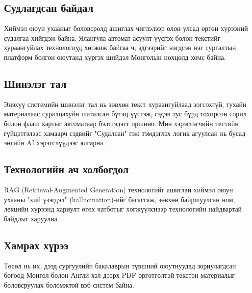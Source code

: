     \subsection*{Судлагдсан байдал}
        Хиймэл оюун ухааныг боловсролд ашиглах чиглэлээр олон улсад өргөн хүрээний судалгаа хийгдэж байна. Ялангуяа автомат асуулт үүсгэх болон текстийг хураангуйлах технологиуд хөгжиж байгаа ч, эдгээрийг нэгдсэн нэг сургалтын платформ болгон оюутанд хүргэх шийдэл Монголын нөхцөлд хомс байна.
        
    \subsection*{Шинэлэг тал}
        Энэхүү системийн шинэлэг тал нь зөвхөн текст хураангуйлаад зогсохгүй, тухайн материалаас суралцахуйн шаталсан бүтэц үүсгэж, сэдэв тус бүрд тохирсон сорил болон флаш картыг автоматаар бэлтгэдэгт оршино. Мөн хэрэглэгчийн тестийн гүйцэтгэлээс хамаарч сэдвийг "Судалсан" гэж тэмдэглэх логик агуулсан нь бусад энгийн AI хэрэгслүүдээс ялгарна.

    \subsection*{Технологийн ач холбогдол}
        RAG (Retrieval-Augmented Generation) технологийг ашиглан хиймэл оюун ухааны "хий үзэгдэл" (hallucination)-ийг багасгаж, зөвхөн байршуулсан ном, лекцийн хүрээнд хариулт өгөх чатботыг хөгжүүлснээр технологийн найдвартай байдлыг харуулна.

        
    \subsection*{Хамрах хүрээ}
    Төсөл нь их, дээд сургуулийн бакалаврын түвшний оюутнуудад зориулагдсан бөгөөд Монгол болон Англи хэл дээрх PDF өргөтгөлтэй текстэн материалыг боловсруулах боломжтой вэб систем байна.